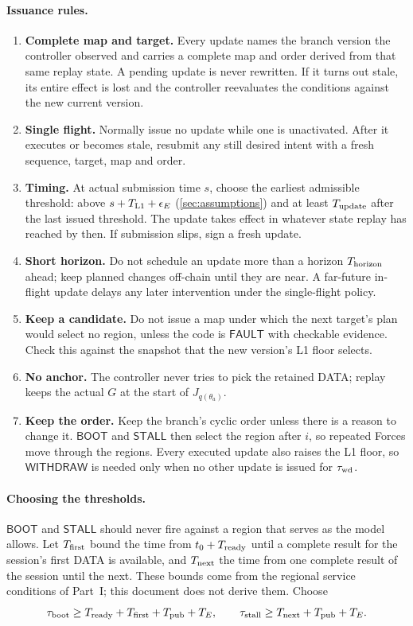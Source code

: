 \documentclass[11pt,a4paper]{article}
\newcommand{\tagg}[1]{\ensuremath{\mathsf{#1}}}
\begin{document}
\paragraph{Issuance rules.}
\begin{enumerate}[label=(R\arabic*)]
\item \textbf{Complete map and target.} Every update names the branch
version the controller observed and carries a complete map and order derived from
that same replay state. A pending update is never rewritten. If it turns
out stale, its entire effect is lost and the controller reevaluates the
conditions against the new current version.
\item \textbf{Single flight.} Normally issue no update while one is
unactivated. After it executes or becomes stale, resubmit any still
desired intent with a fresh sequence, target, map and order.
\item \textbf{Timing.} At actual submission time $s$, choose the
earliest admissible threshold: above $s+T_{\rm L1}+\epsilon_E$
(\cref{sec:assumptions}) and at least $T_{\rm update}$ after the last
issued threshold. The update takes effect in whatever state replay has
reached by then. If submission slips, sign a fresh update.
\item \textbf{Short horizon.} Do not schedule an update more than a
horizon $T_{\rm horizon}$ ahead; keep planned changes off-chain until they are near.
A far-future in-flight update delays any later intervention under the
single-flight policy.
\item \textbf{Keep a candidate.} Do not issue a map under which the next
target's plan would select no region, unless the code is \tagg{FAULT}
with checkable evidence. Check this against the snapshot that the new
version's L1 floor selects.
\item \textbf{No anchor.} The controller never tries to pick the
retained DATA; replay keeps the actual $G$ at the start of
$J_{q(\theta_a)}$.
\item \textbf{Keep the order.} Keep the branch's cyclic order unless there
is a reason to change it. \tagg{BOOT} and \tagg{STALL} then select the
region after $i$, so repeated Forces move through the regions. Every
executed update also raises the L1 floor, so \tagg{WITHDRAW} is needed
only when no other update is issued for $\tau_{\rm wd}$.
\end{enumerate}

\paragraph{Choosing the thresholds.}
\tagg{BOOT} and \tagg{STALL} should never fire against a region that
serves as the model allows. Let $T_{\rm first}$ bound the time from
$t_0+T_{\rm ready}$ until a complete result for the session's first DATA
is available, and $T_{\rm next}$ the time from one complete result of
the session until the next. These bounds come from the regional service
conditions of Part~I; this document does not derive them. Choose
\[
 \tau_{\rm boot}\ge T_{\rm ready}+T_{\rm first}+T_{\rm pub}+T_E,
 \qquad
 \tau_{\rm stall}\ge T_{\rm next}+T_{\rm pub}+T_E.
\]
\end{document}
